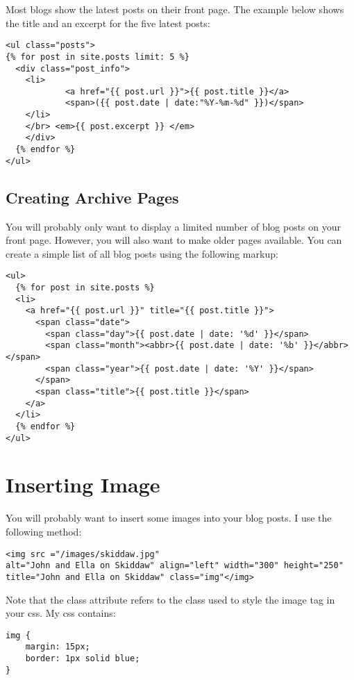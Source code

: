 \documentclass{article}
\begin{document}
Most blogs show the latest posts on their front page. The example below
shows the title and an excerpt for the five latest posts:


\begin{verbatim}
<ul class="posts">
{% for post in site.posts limit: 5 %}
  <div class="post_info">
    <li>
            <a href="{{ post.url }}">{{ post.title }}</a>
            <span>({{ post.date | date:"%Y-%m-%d" }})</span>
    </li>
    </br> <em>{{ post.excerpt }} </em>
    </div>
  {% endfor %}
</ul>
\end{verbatim}
\subsection{Creating Archive Pages}
\label{sec-6-2}


You will probably only want to display a limited number of blog posts on
your front page. However, you will also want to make older pages
available. You can create a simple list of all blog posts using the
following markup:


\begin{verbatim}
<ul>
  {% for post in site.posts %}
  <li>
    <a href="{{ post.url }}" title="{{ post.title }}">
      <span class="date">
        <span class="day">{{ post.date | date: '%d' }}</span>
        <span class="month"><abbr>{{ post.date | date: '%b' }}</abbr></span>
        <span class="year">{{ post.date | date: '%Y' }}</span>
      </span>
      <span class="title">{{ post.title }}</span>
    </a>
  </li>
  {% endfor %}
</ul>
\end{verbatim}
\section{Inserting Image}
\label{sec-7}


You will probably want to insert some images into your blog posts. I use
the following method:


\begin{verbatim}
<img src ="/images/skiddaw.jpg"
alt="John and Ella on Skiddaw" align="left" width="300" height="250"
title="John and Ella on Skiddaw" class="img"</img>
\end{verbatim}

Note that the class attribute refers to the class used to style the
image tag in your css. My css contains:


\begin{verbatim}
img {
    margin: 15px;
    border: 1px solid blue;
}
\end{verbatim}
\end{document}
